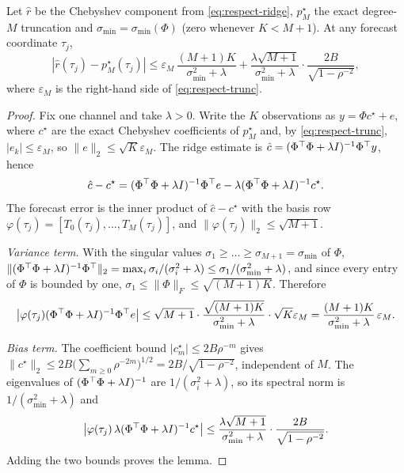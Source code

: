 \begin{lemma}\label{lem:respect-ridge}
Let $\hat r$ be the Chebyshev component from \cref{eq:respect-ridge}, $p^\star_M$ the exact degree-$M$ truncation and $\sigma_{\min}=\sigma_{\min}(\Phi)$ (zero whenever $K<M+1$). At any forecast coordinate $\tau_j$,
\begin{equation}\label{eq:respect-lemma}
  |\hat r(\tau_j)-p^\star_M(\tau_j)| \le \varepsilon_M\,\frac{(M+1)K}{\sigma_{\min}^2+\lambda} + \frac{\lambda\sqrt{M+1}}{\sigma_{\min}^2+\lambda}\cdot\frac{2B}{\sqrt{1-\rho^{-2}}},
\end{equation}
where $\varepsilon_M$ is the right-hand side of \cref{eq:respect-trunc}.
\end{lemma}
\begin{proof}
Fix one channel and take $\lambda>0$. Write the $K$ observations as $y=\Phi c^\star+e$, where $c^\star$ are the exact Chebyshev coefficients of $p^\star_M$ and, by \cref{eq:respect-trunc}, $|e_k|\le\varepsilon_M$, so $\|e\|_2\le\sqrt K\varepsilon_M$. The ridge estimate is $\hat c=(\Phi^{\top}\Phi+\lambda I)^{-1}\Phi^{\top} y$, hence
\begin{equation}
  \hat c - c^\star = (\Phi^{\top}\Phi+\lambda I)^{-1}\Phi^{\top} e - \lambda(\Phi^{\top}\Phi+\lambda I)^{-1}c^\star .
\end{equation}
The forecast error is the inner product of $\hat c-c^\star$ with the basis row $\varphi(\tau_j)=[T_0(\tau_j),\dots,T_M(\tau_j)]$, and $\|\varphi(\tau_j)\|_2\le\sqrt{M+1}$.

\emph{Variance term.} With the singular values $\sigma_1\ge\dots\ge\sigma_{M+1}=\sigma_{\min}$ of $\Phi$,
$\|(\Phi^{\top}\Phi+\lambda I)^{-1}\Phi^{\top}\|_2 = \max_i \sigma_i/(\sigma_i^2+\lambda) \le \sigma_1/(\sigma_{\min}^2+\lambda)$, and since every entry of $\Phi$ is bounded by one, $\sigma_1\le\|\Phi\|_F\le\sqrt{(M+1)K}$. Therefore
\begin{equation}
  \big|\varphi(\tau_j)(\Phi^{\top}\Phi+\lambda I)^{-1}\Phi^{\top} e\big| \le \sqrt{M+1}\cdot\frac{\sqrt{(M+1)K}}{\sigma_{\min}^2+\lambda}\cdot\sqrt K\varepsilon_M = \frac{(M+1)K}{\sigma_{\min}^2+\lambda}\,\varepsilon_M .
\end{equation}

\emph{Bias term.} The coefficient bound $|c^\star_m|\le 2B\rho^{-m}$ gives $\|c^\star\|_2\le 2B\big(\sum_{m\ge0}\rho^{-2m}\big)^{1/2} = 2B/\sqrt{1-\rho^{-2}}$, independent of $M$. The eigenvalues of $(\Phi^{\top}\Phi+\lambda I)^{-1}$ are $1/(\sigma_i^2+\lambda)$, so its spectral norm is $1/(\sigma_{\min}^2+\lambda)$ and
\begin{equation}
  \big|\varphi(\tau_j)\,\lambda(\Phi^{\top}\Phi+\lambda I)^{-1}c^\star\big| \le \frac{\lambda\sqrt{M+1}}{\sigma_{\min}^2+\lambda}\cdot\frac{2B}{\sqrt{1-\rho^{-2}}} .
\end{equation}
Adding the two bounds proves the lemma.
\end{proof}

